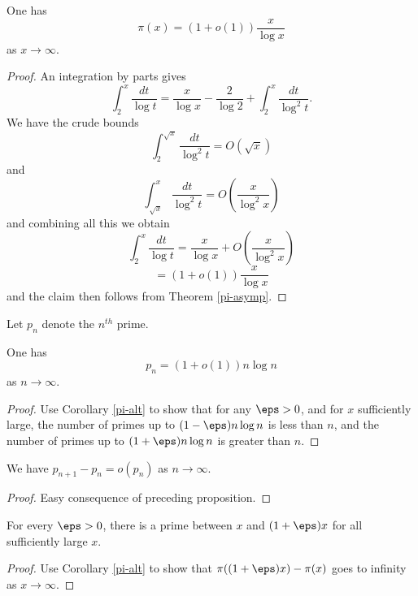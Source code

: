 \begin{corollary}\label{pi-alt}\leanok  One has
$$ \pi(x) = (1+o(1)) \frac{x}{\log x}$$
as $x \to \infty$.
\end{corollary}


\begin{proof}
An integration by parts gives
  $$ \int_2^x \frac{dt}{\log t} = \frac{x}{\log x} - \frac{2}{\log 2} + \int_2^x \frac{dt}{\log^2 t}.$$
We have the crude bounds
$$ \int_2^{\sqrt{x}} \frac{dt}{\log^2 t} = O( \sqrt{x} )$$
and
$$ \int_{\sqrt{x}}^x \frac{dt}{\log^2 t} = O( \frac{x}{\log^2 x} )$$
and combining all this we obtain
$$ \int_2^x \frac{dt}{\log t} = \frac{x}{\log x} + O( \frac{x}{\log^2 x} )$$
$$ = (1+o(1)) \frac{x}{\log x}$$
and the claim then follows from Theorem \ref{pi-asymp}.
\end{proof}


Let $p_n$ denote the $n^{th}$ prime.

\begin{proposition}\label{pn-asymptotic}\leanok
 One has
  $$ p_n = (1+o(1)) n \log n$$
as $n \to \infty$.
\end{proposition}


\begin{proof}
Use Corollary \ref{pi-alt} to show that for any $\eps>0$, and for $x$ sufficiently large, the number of primes up to $(1-\eps) n \log n$ is less than $n$, and the number of primes up to $(1+\eps) n \log n$ is greater than $n$.
\end{proof}


\begin{corollary} \label{pn-pnPlus1}\leanok
We have $p_{n+1} - p_n = o(p_n)$
  as $n \to \infty$.
\end{corollary}


\begin{proof}
  Easy consequence of preceding proposition.
\end{proof}


\begin{corollary}  \label{prime-between}\leanok
For every $\eps>0$, there is a prime between $x$ and $(1+\eps)x$ for all sufficiently large $x$.
\end{corollary}


\begin{proof}
Use Corollary \ref{pi-alt} to show that $\pi((1+\eps)x) - \pi(x)$ goes to infinity as $x \to \infty$.
\end{proof}



